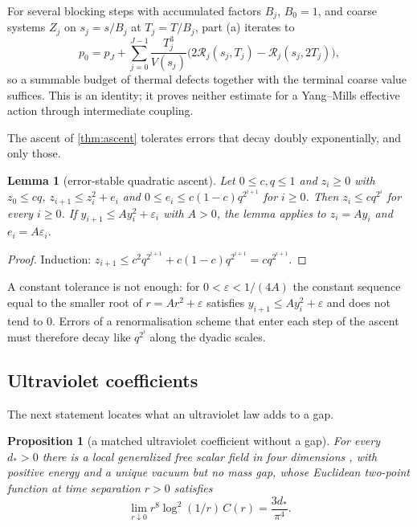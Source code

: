 \documentclass[11pt,a4paper]{amsart}
\newtheorem{proposition}[theorem]{Proposition}
\newtheorem{lemma}[theorem]{Lemma}
\theoremstyle{definition}
\theoremstyle{remark}
\numberwithin{equation}{section}
\newcommand{\Vol}[1]{V(#1)}                %
\begin{document}
For several blocking steps with accumulated factors $B_j$, $B_0=1$, and coarse systems $Z_j$ on $s_j=s/B_j$ at $T_j=T/B_j$, part (a) iterates to
\[
p_0=p_J+\sum_{j=0}^{J-1}\frac{T_j^3}{\Vol{s_j}}\bigl(2\mathcal R_j(s_j,T_j)-\mathcal R_j(s_j,2T_j)\bigr),
\]
so a summable budget of thermal defects together with the terminal coarse value suffices. This is an identity; it proves neither estimate for a Yang--Mills effective action through intermediate coupling.

The ascent of \cref{thm:ascent} tolerates errors that decay doubly exponentially, and only those.

\begin{lemma}[error-stable quadratic ascent]\label{ms:lem:noisy-ascent}
Let $0\le c,q\le1$ and $z_i\ge0$ with $z_0\le cq$, $z_{i+1}\le z_i^2+e_i$ and $0\le e_i\le c(1-c)q^{2^{i+1}}$ for $i\ge0$. Then $z_i\le cq^{2^i}$ for every $i\ge0$. If $y_{i+1}\le Ay_i^2+\varepsilon_i$ with $A>0$, the lemma applies to $z_i=Ay_i$ and $e_i=A\varepsilon_i$.
\end{lemma}

\begin{proof}
Induction: $z_{i+1}\le c^2q^{2^{i+1}}+c(1-c)q^{2^{i+1}}=cq^{2^{i+1}}$.
\end{proof}

A constant tolerance is not enough: for $0<\varepsilon<1/(4A)$ the constant sequence equal to the smaller root of $r=Ar^2+\varepsilon$ satisfies $y_{i+1}\le Ay_i^2+\varepsilon$ and does not tend to $0$. Errors of a renormalisation scheme that enter each step of the ascent must therefore decay like $q^{2^{i}}$ along the dyadic scales.

\subsection{Ultraviolet coefficients}

The next statement locates what an ultraviolet law adds to a gap.

\begin{proposition}[a matched ultraviolet coefficient without a gap]\label{ms:prop:GFF}
For every $d_*>0$ there is a local generalized free scalar field in four dimensions \cite{greenberg1961}, with positive energy and a unique vacuum but no mass gap, whose Euclidean two-point function at time separation $r>0$ satisfies
\[
\lim_{r\downarrow0}r^8\log^2(1/r)\,C(r)=\frac{3d_*}{\pi^4}.
\]
\end{proposition}
\end{document}
